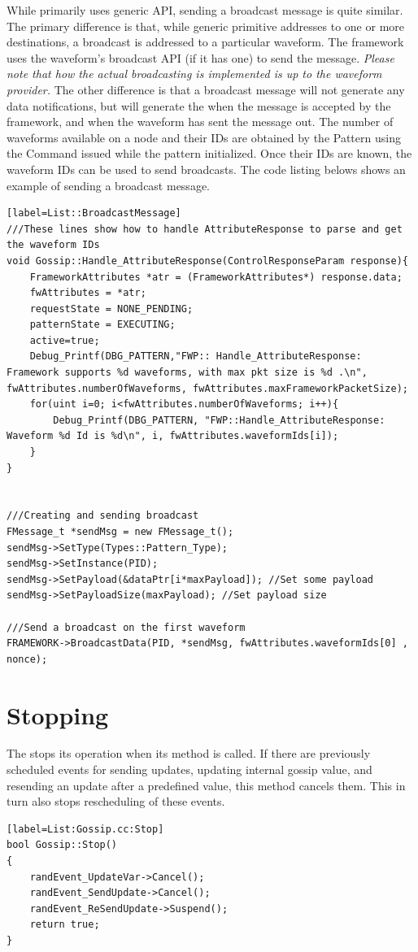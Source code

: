 While  primarily uses generic  API, sending a broadcast message is quite similar. The primary
difference is that, 
while generic  primitive addresses to one or more destinations, 
a broadcast is addressed to a particular waveform.
The framework uses the waveform's broadcast API (if it has one) to
send the message. 
\textit{Please note that how the actual broadcasting is
  implemented is up to the waveform provider.} 
The other difference is that a broadcast message will not generate any  data notifications, 
but will generate the  when the message is accepted by the framework, and 
 when the waveform has sent the message out.
The number of waveforms available on a node and their IDs are obtained by the Pattern using the  Command issued while the pattern initialized. 
Once their IDs are known, the waveform IDs can be used to send broadcasts. 
The code listing belows shows an example of sending a broadcast message.

\begin{lstlisting}[style=boralargefile]  [label=List::BroadcastMessage]
///These lines show how to handle AttributeResponse to parse and get the waveform IDs
void Gossip::Handle_AttributeResponse(ControlResponseParam response){
	FrameworkAttributes *atr = (FrameworkAttributes*) response.data;
	fwAttributes = *atr;
	requestState = NONE_PENDING;
	patternState = EXECUTING;
	active=true;
	Debug_Printf(DBG_PATTERN,"FWP:: Handle_AttributeResponse: Framework supports %d waveforms, with max pkt size is %d .\n", fwAttributes.numberOfWaveforms, fwAttributes.maxFrameworkPacketSize);
	for(uint i=0; i<fwAttributes.numberOfWaveforms; i++){
		Debug_Printf(DBG_PATTERN, "FWP::Handle_AttributeResponse: Waveform %d Id is %d\n", i, fwAttributes.waveformIds[i]);
	}
}


///Creating and sending broadcast
FMessage_t *sendMsg = new FMessage_t();
sendMsg->SetType(Types::Pattern_Type);
sendMsg->SetInstance(PID);
sendMsg->SetPayload(&dataPtr[i*maxPayload]); //Set some payload
sendMsg->SetPayloadSize(maxPayload); //Set payload size

///Send a broadcast on the first waveform
FRAMEWORK->BroadcastData(PID, *sendMsg, fwAttributes.waveformIds[0] , nonce);
\end{lstlisting}

\section {Stopping}
The  stops its operation when its  method is called. 
If there are previously scheduled events for 
sending updates, 
updating internal gossip value, and 
resending an update after a predefined value,
this method cancels them. 
This in turn also stops rescheduling of these events. 
\begin{lstlisting}[style=boralargefile][label=List:Gossip.cc:Stop]
bool Gossip::Stop()
{
	randEvent_UpdateVar->Cancel();
	randEvent_SendUpdate->Cancel();
	randEvent_ReSendUpdate->Suspend();
	return true;
}
\end{lstlisting}

